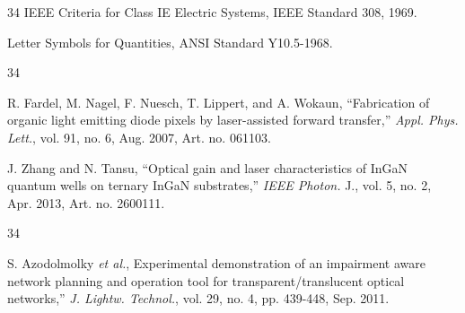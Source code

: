 \documentclass{IEEEojcsys}
\begin{document}
\vspace*{-12pt}

\begin{thebibliography}{34}
\setcounter{enumiv}{29}
\bibitem{}IEEE Criteria for Class IE Electric Systems, IEEE Standard 308, 1969.

\bibitem{} Letter Symbols for Quantities, ANSI Standard Y10.5-1968.
\end{thebibliography}

\vspace*{-12pt}

\begin{thebibliography}{34}

\setcounter{enumiv}{31}

\bibitem{}R. Fardel, M. Nagel, F. Nuesch, T. Lippert, and A. Wokaun, ``Fabrication of organic light emitting diode pixels by laser-assisted forward transfer,'' {\em Appl. Phys. Lett.}, vol. 91, no. 6, Aug. 2007, Art. no. 061103. %

\bibitem{} J. Zhang and N. Tansu, ``Optical gain and laser characteristics of InGaN quantum wells on ternary InGaN substrates,'' {\em IEEE Photon.} J., vol. 5, no. 2, Apr. 2013, Art. no. 2600111. %
\end{thebibliography}

\vspace*{-12pt}

\begin{thebibliography}{34}
\setcounter{enumiv}{33}

\bibitem{}S. Azodolmolky {\em et al.}, Experimental demonstration of an impairment aware network planning and operation tool for transparent/translucent optical networks,'' {\em J. Lightw. Technol.}, vol. 29, no. 4, pp. 439-448, Sep. 2011.
\end{thebibliography}\vspace*{5pt}
\end{document}
